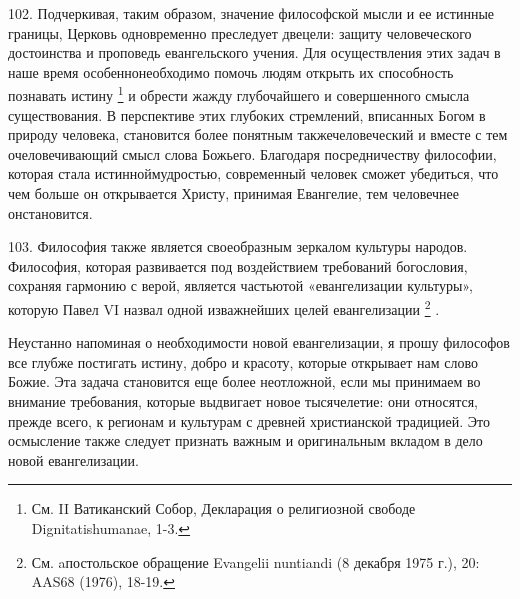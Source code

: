 \documentclass[a5paper,10pt]{article}
\begin{document}
102. Подчеркивая, таким образом, значение философской мысли и ее истинные
границы, Церковь одновременно преследует двецели: защиту человеческого
достоинства и проповедь евангельского учения. Для осуществления этих задач в
наше время особеннонеобходимо помочь людям открыть их способность познавать
истину \footnote{См. II Ватиканский Собор, Декларация о религиозной свободе
Dignitatishumanae, 1-3.} и обрести жажду глубочайшего и совершенного смысла
существования. В перспективе этих глубоких стремлений, вписанных Богом в
природу человека, становится более понятным такжечеловеческий и вместе с тем
очеловечивающий смысл слова Божьего. Благодаря посредничеству философии,
которая стала истинноймудростью, современный человек сможет убедиться, что чем
больше он открывается Христу, принимая Евангелие, тем человечнее онстановится.

103. Философия также является своеобразным зеркалом культуры народов.
Философия, которая развивается под воздействием требований богословия, сохраняя
гармонию с верой, является частьютой «евангелизации культуры», которую Павел VI
назвал одной изважнейших целей евангелизации \footnote{См. aпостольское
обращение Evangelii nuntiandi (8 декабря 1975 г.), 20: AAS68 (1976), 18-19.} .

Неустанно напоминая о необходимости новой евангелизации, я прошу философов все
глубже постигать истину, добро и красоту, которые открывает нам слово Божие.
Эта задача становится еще более неотложной, если мы принимаем во внимание
требования, которые выдвигает новое тысячелетие: они относятся, прежде всего, к
регионам и культурам с древней христианской традицией. Это осмысление также
следует признать важным и оригинальным вкладом в дело новой евангелизации.
\end{document}
